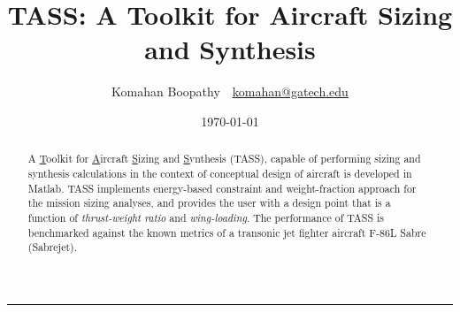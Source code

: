 \documentclass[pdftex,11pt,letter]{article}
\title{\textbf{\textsc{TASS}: A Toolkit for Aircraft Sizing and Synthesis}}
\author{Komahan Boopathy~~\url{komahan@gatech.edu}} \date{\today}
\begin{document}

\clearpage
\tableofcontents
\clearpage
\listoffigures
\listoftables

\maketitle
\vspace{-0.25in}
\rule{\linewidth}{2pt}

\begin{abstract}
A  \ul{T}oolkit for \ul{A}ircraft \ul{S}izing and \ul{S}ynthesis (TASS), capable of performing sizing and synthesis calculations  in the context of conceptual design of aircraft is developed in Matlab\cite{MATLAB}. TASS implements energy-based constraint and weight-fraction approach for the mission sizing analyses, and provides the user with a design point that is a function of \emph{thrust-weight ratio} and \emph{wing-loading}.  The performance of TASS is benchmarked against the known metrics of a transonic jet fighter aircraft F-86L Sabre (Sabrejet).
\end{abstract}
\end{document}
